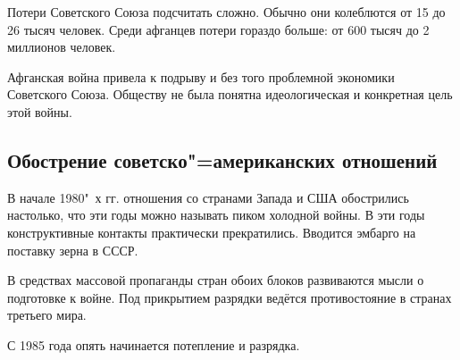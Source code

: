     Потери Советского Союза подсчитать сложно. Обычно они колеблются от 15 до 26 тысяч человек. Среди афганцев потери гораздо больше: от 600 тысяч до 2 миллионов человек.
    
    Афганская война привела к подрыву и без того проблемной экономики Советского Союза. Обществу не была понятна идеологическая и конкретная цель этой войны.

    \subsection{Обострение советско"=американских отношений}
    
    В начале 1980"~х гг. отношения со странами Запада и США обострились настолько, что эти годы можно называть пиком холодной войны. В эти годы конструктивные контакты практически прекратились. Вводится эмбарго на поставку зерна в СССР.
    
    В средствах массовой пропаганды стран обоих блоков развиваются мысли о подготовке к войне. Под прикрытием разрядки ведётся противостояние в странах третьего мира.
    
    С 1985 года опять начинается потепление и разрядка.
    
